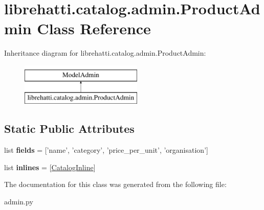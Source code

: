 \hypertarget{classlibrehatti_1_1catalog_1_1admin_1_1ProductAdmin}{\section{librehatti.\-catalog.\-admin.\-Product\-Admin Class Reference}
\label{classlibrehatti_1_1catalog_1_1admin_1_1ProductAdmin}
}
Inheritance diagram for librehatti.\-catalog.\-admin.\-Product\-Admin\-:\begin{figure}[H]
\begin{center}
\leavevmode
\includegraphics[height=2.000000cm]{classlibrehatti_1_1catalog_1_1admin_1_1ProductAdmin}
\end{center}
\end{figure}
\subsection*{Static Public Attributes}
\begin{DoxyCompactItemize}
\item 
\hypertarget{classlibrehatti_1_1catalog_1_1admin_1_1ProductAdmin_a3bfaf5e99f9f0f095224b36bd0244280}{list {\bfseries fields} = \mbox{[}'name', 'category', 'price\-\_\-per\-\_\-unit', 'organisation'\mbox{]}}\label{classlibrehatti_1_1catalog_1_1admin_1_1ProductAdmin_a3bfaf5e99f9f0f095224b36bd0244280}

\item 
\hypertarget{classlibrehatti_1_1catalog_1_1admin_1_1ProductAdmin_a68b23952630280d1a8f19d7da02cea0c}{list {\bfseries inlines} = \mbox{[}\hyperlink{classlibrehatti_1_1catalog_1_1admin_1_1CatalogInline}{Catalog\-Inline}\mbox{]}}\label{classlibrehatti_1_1catalog_1_1admin_1_1ProductAdmin_a68b23952630280d1a8f19d7da02cea0c}

\end{DoxyCompactItemize}


The documentation for this class was generated from the following file\-:\begin{DoxyCompactItemize}
\item 
admin.\-py\end{DoxyCompactItemize}
